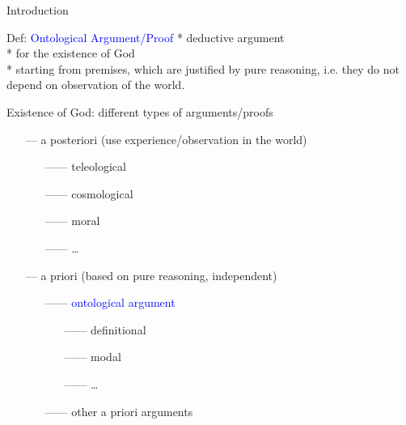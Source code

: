\begin{frame}{Introduction}\large
\begin{block}{Def: \textcolor{blue}{Ontological Argument/Proof}}
* deductive argument \\

* for the existence of God \\

* starting from premises, which are justified by pure reasoning,
i.e. they do not depend on observation of the world.
\end{block}

\vfill \pause
Existence of God: different types of arguments/proofs\\[.2em]
\begin{itemize}
\item[---]a posteriori (use experience/observation in the world)
  \begin{itemize}
  \item[------]teleological
  \item[------]cosmological
  \item[------]moral
  \item[------] \ldots
  \end{itemize}  
\item[---]a priori (based on pure reasoning, independent)
  \begin{itemize}
  \item[------]\textcolor{blue}{ontological argument}
    \begin{itemize}
    \item[------]definitional 
    \item[------]modal 
    \item[------] \ldots
    \end{itemize}
  \item[------]other a priori arguments
  \end{itemize}
\end{itemize}
\end{frame}

